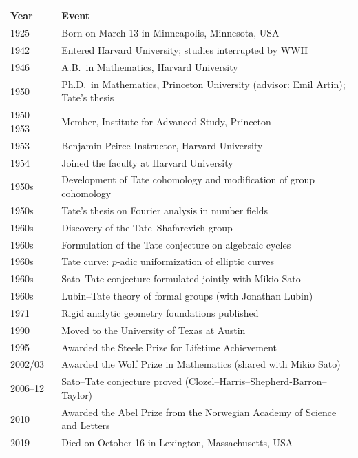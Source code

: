 \begin{tabularx}{\linewidth}{|p{1.5cm}|>{\raggedright\arraybackslash}X|}
\hline
\textbf{Year} & \textbf{Event} \\ \hline
1925 & Born on March 13 in Minneapolis, Minnesota, USA \\ \hline
1942 & Entered Harvard University; studies interrupted by WWII \\ \hline
1946 & A.B.\ in Mathematics, Harvard University \\ \hline
1950 & Ph.D.\ in Mathematics, Princeton University (advisor: Emil Artin); Tate's thesis \\ \hline
1950--1953 & Member, Institute for Advanced Study, Princeton \\ \hline
1953 & Benjamin Peirce Instructor, Harvard University \\ \hline
1954 & Joined the faculty at Harvard University \\ \hline
1950s & Development of Tate cohomology and modification of group cohomology \\ \hline
1950s & Tate's thesis on Fourier analysis in number fields \\ \hline
1960s & Discovery of the Tate--Shafarevich group \\ \hline
1960s & Formulation of the Tate conjecture on algebraic cycles \\ \hline
1960s & Tate curve: \(p\)-adic uniformization of elliptic curves \\ \hline
1960s & Sato--Tate conjecture formulated jointly with Mikio Sato \\ \hline
1960s & Lubin--Tate theory of formal groups (with Jonathan Lubin) \\ \hline
1971 & Rigid analytic geometry foundations published \\ \hline
1990 & Moved to the University of Texas at Austin \\ \hline
1995 & Awarded the Steele Prize for Lifetime Achievement \\ \hline
2002/03 & Awarded the Wolf Prize in Mathematics (shared with Mikio Sato) \\ \hline
2006--12 & Sato--Tate conjecture proved (Clozel--Harris--Shepherd-Barron--Taylor) \\ \hline
2010 & Awarded the Abel Prize from the Norwegian Academy of Science and Letters \\ \hline
2019 & Died on October 16 in Lexington, Massachusetts, USA \\ \hline
\end{tabularx}

